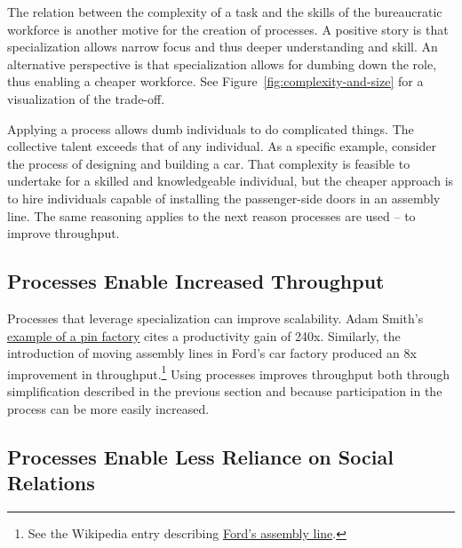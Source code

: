 The relation between the complexity of a task and the skills of the bureaucratic workforce is another motive for the creation of processes.
A positive story is that specialization allows narrow focus and thus deeper understanding and skill. An alternative perspective is that specialization allows for dumbing down the role, thus enabling a cheaper workforce. See Figure~\ref{fig:complexity-and-size}%
\iftoggle{haspagenumbers}{on page~\pageref{fig:complexity-and-size}}{}
for a visualization of the trade-off.

Applying a process allows dumb individuals to do complicated things. The collective talent exceeds that of any individual.  As a specific example, consider the process of designing and building a car. That complexity is feasible to undertake for a skilled and knowledgeable individual, but the cheaper approach is to hire individuals capable of installing the passenger-side doors in an assembly line. The same reasoning applies to the next reason processes are used -- to improve throughput.



\subsection*{Processes Enable Increased Throughput}

Processes that leverage specialization can improve scalability. Adam Smith's \href{https://en.wikipedia.org/wiki/Business_process\%23Adam_Smith}{example of a pin factory} cites a productivity gain of 240x.
Similarly, the introduction of moving assembly lines in Ford's car factory produced an 8x improvement in throughput.\footnote{See the Wikipedia entry describing \href{https://en.wikipedia.org/wiki/Assembly_line\%2320th_century}{Ford's assembly line}.
} Using processes improves throughput both through simplification described in the previous section and because participation in the process can be more easily increased.


\subsection*{Processes Enable Less Reliance on Social Relations}

